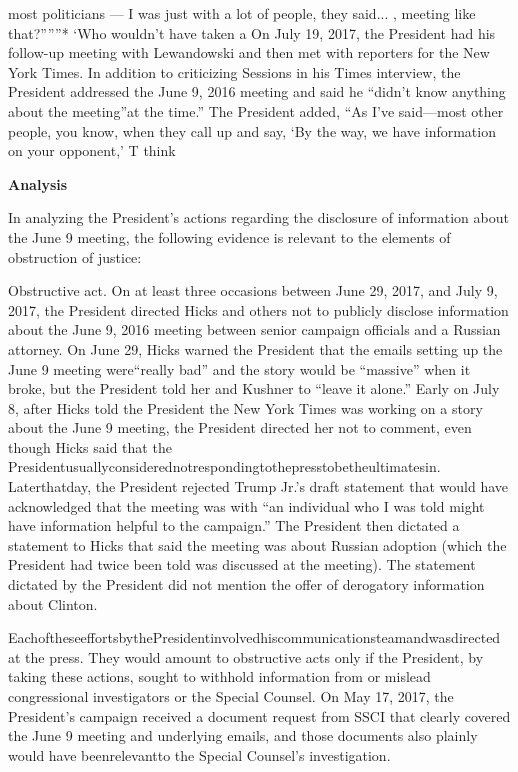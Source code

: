 most politicians — I was just with a lot of people, they said... , meeting like that?”””*
‘Who wouldn't have taken a
On July 19, 2017, the President had his follow-up meeting with Lewandowski and then met with reporters for the New York Times.
In addition to criticizing Sessions in his Times interview, the President addressed the June 9, 2016 meeting and said he “didn't know anything about the meeting”at the time.”
The President added, “As I've said—most other people, you know, when they call up and say, ‘By the way, we have information on your opponent,' T think

\begin{center}
\textbf{Analysis}
\end{center}

In analyzing the President's actions regarding the disclosure of information about the June 9 meeting, the following evidence is relevant to the elements of obstruction of justice:

Obstructive act.
On at least three occasions between June 29, 2017, and July 9, 2017, the President directed Hicks and others not to publicly disclose information about the June 9, 2016 meeting between senior campaign officials and a Russian attorney.
On June 29, Hicks warned the President that the emails setting up the June 9 meeting were“really bad” and the story would be “massive” when it broke, but the President told her and Kushner to “leave it alone.”
Early on July 8, after Hicks told the President the New York Times was working on a story about the June 9 meeting, the President directed her not to comment, even though Hicks said that the Presidentusuallyconsiderednotrespondingtothepresstobetheultimatesin.
Laterthatday, the President rejected Trump Jr.'s draft statement that would have acknowledged that the meeting was with “an individual who I was told might have information helpful to the campaign.” The President then dictated a statement to Hicks that said the meeting was about Russian adoption (which the President had twice been told was discussed at the meeting).
The statement dictated by the President did not mention the offer of derogatory information about Clinton.

EachoftheseeffortsbythePresidentinvolvedhiscommunicationsteamandwasdirected at the press.
They would amount to obstructive acts only if the President, by taking these actions, sought to withhold information from or mislead congressional investigators or the Special Counsel.
On May 17, 2017, the President's campaign received a document request from SSCI that clearly covered the June 9 meeting and underlying emails, and those documents also plainly would have beenrelevantto the Special Counsel's investigation.

